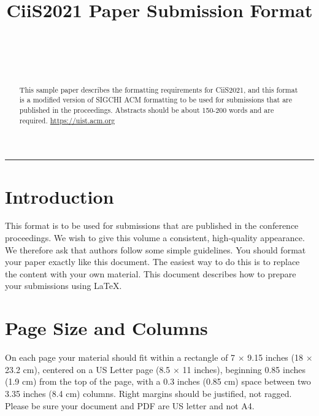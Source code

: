 \documentclass{ciis}
\def\plaintitle{CiiS2021 Paper Submission Format}
\begin{document}
\title{\plaintitle}

\author{%
  \\
  \\
  \\
}

\maketitle

\begin{abstract}
This sample paper describes the formatting requirements for CiiS2021, and this format is a modified version of SIGCHI ACM formatting to be used for submissions that are published in the proceedings. Abstracts should be about 150-200 words and are required. \url{https://uist.acm.org} 
\end{abstract}

\noindent\rule{8cm}{0.4pt}

\section{Introduction}

This format is to be used for submissions that are published in the
conference proceedings. We wish to give this volume a consistent,
high-quality appearance. We therefore ask that authors follow some
simple guidelines. You should format your paper exactly like this
document. The easiest way to do this is to replace the content with
your own material.  This document describes how to prepare your
submissions using \LaTeX.

\section{Page Size and Columns}
On each page your material should fit within a rectangle of 7 $\times$
9.15 inches (18 $\times$ 23.2 cm), centered on a US Letter page (8.5
$\times$ 11 inches), beginning 0.85 inches (1.9 cm) from the top of
the page, with a 0.3 inches (0.85 cm) space between two 3.35 inches
(8.4 cm) columns. Right margins should be justified, not
ragged. Please be sure your document and PDF are US letter and not A4.
\end{document}
